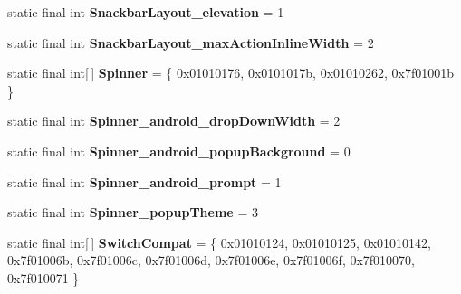 \begin{DoxyCompactItemize}
\item 
\hypertarget{classandroid_1_1support_1_1design_1_1_r_1_1styleable_a54f3338cb1db3190d4f8d5f3a2475ddd}{}static final int {\bfseries Snackbar\+Layout\+\_\+elevation} = 1\label{classandroid_1_1support_1_1design_1_1_r_1_1styleable_a54f3338cb1db3190d4f8d5f3a2475ddd}

\item 
\hypertarget{classandroid_1_1support_1_1design_1_1_r_1_1styleable_a0c233bcf31327c9409249283a7e660fa}{}static final int {\bfseries Snackbar\+Layout\+\_\+max\+Action\+Inline\+Width} = 2\label{classandroid_1_1support_1_1design_1_1_r_1_1styleable_a0c233bcf31327c9409249283a7e660fa}

\item 
\hypertarget{classandroid_1_1support_1_1design_1_1_r_1_1styleable_ac36e55e5a1c717e866dcadd92552fa64}{}static final int\mbox{[}$\,$\mbox{]} {\bfseries Spinner} = \{ 0x01010176, 0x0101017b, 0x01010262, 0x7f01001b \}\label{classandroid_1_1support_1_1design_1_1_r_1_1styleable_ac36e55e5a1c717e866dcadd92552fa64}

\item 
\hypertarget{classandroid_1_1support_1_1design_1_1_r_1_1styleable_ab7674adcb14e8faef5f8b8ba404f68f0}{}static final int {\bfseries Spinner\+\_\+android\+\_\+drop\+Down\+Width} = 2\label{classandroid_1_1support_1_1design_1_1_r_1_1styleable_ab7674adcb14e8faef5f8b8ba404f68f0}

\item 
\hypertarget{classandroid_1_1support_1_1design_1_1_r_1_1styleable_ad937f167c55cbb577ed47c893518d69b}{}static final int {\bfseries Spinner\+\_\+android\+\_\+popup\+Background} = 0\label{classandroid_1_1support_1_1design_1_1_r_1_1styleable_ad937f167c55cbb577ed47c893518d69b}

\item 
\hypertarget{classandroid_1_1support_1_1design_1_1_r_1_1styleable_a6465e68ffbefc95670289286dfc4502c}{}static final int {\bfseries Spinner\+\_\+android\+\_\+prompt} = 1\label{classandroid_1_1support_1_1design_1_1_r_1_1styleable_a6465e68ffbefc95670289286dfc4502c}

\item 
\hypertarget{classandroid_1_1support_1_1design_1_1_r_1_1styleable_a6ca303c6731fcf4e6937395aaf5ddf89}{}static final int {\bfseries Spinner\+\_\+popup\+Theme} = 3\label{classandroid_1_1support_1_1design_1_1_r_1_1styleable_a6ca303c6731fcf4e6937395aaf5ddf89}

\item 
\hypertarget{classandroid_1_1support_1_1design_1_1_r_1_1styleable_a7389a923bf3e321b6b5d10b0589547a1}{}static final int\mbox{[}$\,$\mbox{]} {\bfseries Switch\+Compat} = \{ 0x01010124, 0x01010125, 0x01010142, 0x7f01006b, 0x7f01006c, 0x7f01006d, 0x7f01006e, 0x7f01006f, 0x7f010070, 0x7f010071 \}\label{classandroid_1_1support_1_1design_1_1_r_1_1styleable_a7389a923bf3e321b6b5d10b0589547a1}


\end{DoxyCompactItemize}
